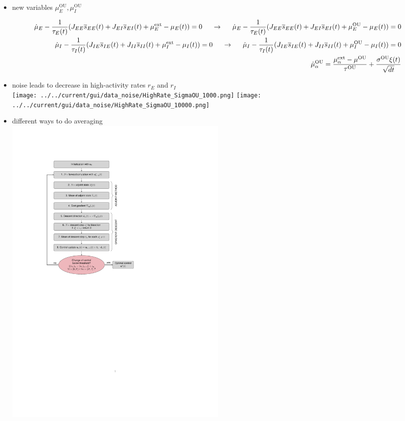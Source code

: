 \documentclass[]{article}
\begin{document}
\begin{itemize}
	\item new variables $\mu_E^\text{OU}, \mu_I^\text{OU}$\\
	\begin{footnotesize}
		\begin{align*}
			\dot{\mu}_E - \frac{1}{\tau_E(t)} (J_{EE}\overline{s}_{EE}(t) + J_{EI} \overline{s}_{EI}(t) + \mu_E^\text{ext} - \mu_E(t) ) = 0 \hspace{5mm} \rightarrow \hspace{5mm} \dot{\mu}_E - \frac{1}{\tau_E(t)} (J_{EE}\overline{s}_{EE}(t) + J_{EI} \overline{s}_{EI}(t) + \mu_E^\text{OU} - \mu_E(t) ) = 0 \\ 
			\dot{\mu}_I - \frac{1}{\tau_I(t)} (J_{IE}\overline{s}_{IE}(t) + J_{II} \overline{s}_{II}(t) + \mu_I^\text{ext} - \mu_I(t) ) = 0 \hspace{5mm} \rightarrow \hspace{5mm} \dot{\mu}_I - \frac{1}{\tau_I(t)} (J_{IE}\overline{s}_{IE}(t) + J_{II} \overline{s}_{II}(t) + \mu_I^\text{OU} - \mu_I(t) ) = 0\\
			\dot{\mu}^\text{OU}_\alpha = \frac{\mu_\alpha^\text{ext} - \mu^\text{OU}}{\tau^\text{OU}} + \frac{\sigma^\text{OU} \xi(t)}{\sqrt{dt}}
		\end{align*}
	\end{footnotesize}
	\item noise leads to decrease in high-activity rates $r_{E}$ and $r_I$\\
	\texttt{[image: ../../current/gui/data\_noise/HighRate\_SigmaOU\_1000.png]}
	\texttt{[image: ../../current/gui/data\_noise/HighRate\_SigmaOU\_10000.png]}
	\item different ways to do averaging\\
	\includegraphics[width=0.5\textwidth, trim={5cm 18cm 12cm 5cm},clip]{./flowchart_noise.pdf}

\end{itemize}
\end{document}

